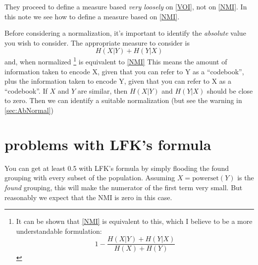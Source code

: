 \documentclass[9pt,technote]{IEEEtran}
\begin{document}
They proceed to define a measure based \emph{very loosely} on \cref{VOI}, not on \cref{NMI}. In this note we see how to define a measure
based on \cref{NMI}.

Before considering a normalization, it's important to identify the \emph{absolute} value you wish to consider.
The appropriate measure to consider is
\begin{equation}
	H(X|Y) + H(Y|X)   \label{CorrectMI}
\end{equation}
and, when normalized \footnote{
	It can be shown that \cref{NMI} is equivalent to this, which I believe to be a more understandable formulation:
 \[
	1 - \frac { H(X|Y) + H(Y|X)  }{ H(X) + H(Y) } 
	\]
} is equivalent to \cref{NMI}
This means the amount of information taken to encode X, given that you can refer to Y as a ``codebook'', plus
the information taken to encode Y, given that you can refer to X as a ``codebook''. If $X$ and $Y$ are similar, then
$H(X|Y)$ and $H(Y|X)$ should be close to zero. Then we can identify a suitable normalization (but see the warning in \cref{sec:AbNormal})

\begin{comment}
\section{WARNING}
I'm pretty sloppy, as ever, with my terminology. I just take $H(x)$ to mean the number of bits taken to encode $x$. Hence
I tend to think in $\log_2$, the log to the base 2, when technically I suppose it should be $\log_e$. There's lots of other careless things too, no doubt \begin{turn}{90}(-:\end{turn}.
\end{comment}

\section{problems with LFK's formula}
\label{sec:Flood}

You can get at least 0.5 with LFK's formula by simply flooding the found grouping with every subset of the population.
Assuming $X = \mbox{powerset}(Y)$ is the \emph{found} grouping, this will make the numerator of the first term
very small. But reasonably we expect that the NMI is zero in this case.
\end{document}
